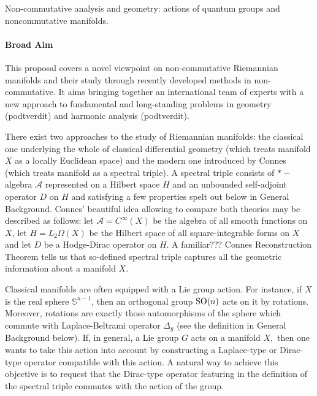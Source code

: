 \documentclass{article}
\newcommand{\archeading}[1]{\vspace{.3cm} \noindent{\bfseries #1} \vspace{.1cm}   }
\begin{document}
\parindent=20pt
\pagestyle{empty}
\newpage


\archeading{Project Title} Non-commutative analysis and geometry: actions of quantum groups and noncommutative manifolds.

\bigskip\archeading{Aims and Background}

\paragraph*{Broad Aim} This proposal covers a novel viewpoint on non-commutative Riemannian manifolds and their study through recently developed methods in non-commutative. It aims bringing together an international team of experts with a new approach to fundamental and long-standing problems in geometry (podtverdit) and harmonic analysis (podtverdit).

There exist two approaches to the study of Riemannian manifolds: the classical one underlying the whole of classical differential geometry (which treats manifold $X$ as a locally Euclidean space) and the modern one introduced by Connes (which treats manifold as a spectral triple).  A spectral triple consists of $\ast-$algebra $\mathcal{A}$ represented on a Hilbert space $H$ and an unbounded self-adjoint operator $D$ on $H$ and satisfying a few properties spelt out below in General Background. Connes' beautiful idea \cite{Connes-book} allowing to compare both theories may be described as follows: let  $\mathcal{A}=C^{\infty}(X)$ be the algebra of all smooth functions on $X$, let $H=L_2\Omega(X)$ be the Hilbert space of all square-integrable forms on $X$ and let $D$ be a Hodge-Dirac operator \cite{BGV} on $H$. A {\color{red}familiar???} Connes Reconstruction Theorem \cite{Connes-reconstruction} tells us that so-defined spectral triple captures all the geometric information about a manifold $X.$

Classical manifolds are often equipped with a Lie group action. For instance, if $X$ is the real sphere $\mathbb{S}^{n-1}$, then an orthogonal group ${\rm SO}(n)$ acts on it by rotations. Moreover, rotations are exactly those automorphisms of the sphere which commute with Laplace-Beltrami operator $\Delta_g$ (see the definition in General Background below). If, in general, a Lie group $G$ acts on a manifold $X,$ then one wants to take this action into account by constructing a Laplace-type or Dirac-type operator compatible with this action. A natural way to achieve this objective is to request that the Dirac-type operator featuring in the definition of the spectral triple commutes with the action of the group.
\end{document}
